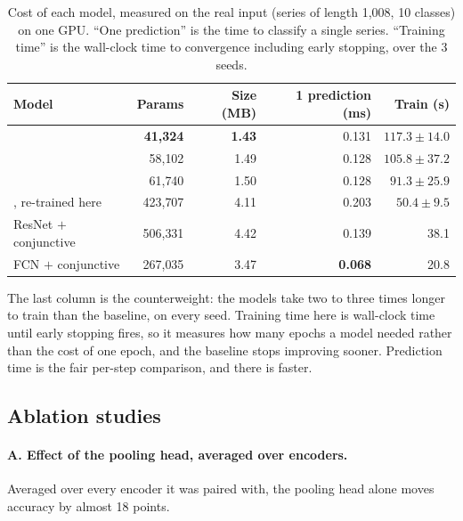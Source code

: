 \begin{table}[htbp]
\caption{Cost of each model, measured on the real \webtraffic{} input (series of length 1{,}008,
10 classes) on one GPU. ``One prediction'' is the time to classify a single series. ``Training
time'' is the wall-clock time to convergence including early stopping, over the 3 \webtraffic{}
seeds.}
\label{tab:cost}
\begin{center}
\footnotesize
\setlength{\tabcolsep}{5pt}
\begin{tabular}{lrrrr}
\toprule
\textbf{Model} & \textbf{Params} & \textbf{Size (MB)} &
\textbf{1 prediction (ms)} & \textbf{Train (s)} \\
\midrule
\mbot{}                   & \textbf{41{,}324}  & \textbf{1.43} & 0.131 & $117.3\pm14.0$ \\
\minp{}                   & 58{,}102  & 1.49 & 0.128 & $105.8\pm37.2$ \\
\mgat{}                   & 61{,}740  & 1.50 & 0.128 & $91.3\pm25.9$ \\
\millet{}, re-trained here & 423{,}707 & 4.11 & 0.203 & $50.4\pm9.5$ \\
ResNet $+$ conjunctive     & 506{,}331 & 4.42 & 0.139 & 38.1 \\
FCN $+$ conjunctive        & 267{,}035 & 3.47 & \textbf{0.068} & 20.8 \\
\bottomrule
\end{tabular}
\end{center}
\end{table}

The last column is the counterweight: the \seanet{} models take two to three times longer to train
than the baseline, on every seed. Training time here is wall-clock time until early stopping fires,
so it measures how many epochs a model needed rather than the cost of one epoch, and the baseline
stops improving sooner. Prediction time is the fair per-step comparison, and there \seanet{} is
faster.

\subsection{Ablation studies}
\label{app:ablations}

\paragraph{A. Effect of the pooling head, averaged over encoders.}
Averaged over every encoder it was paired with, the pooling head alone moves \webtraffic{} accuracy
by almost 18 points.

